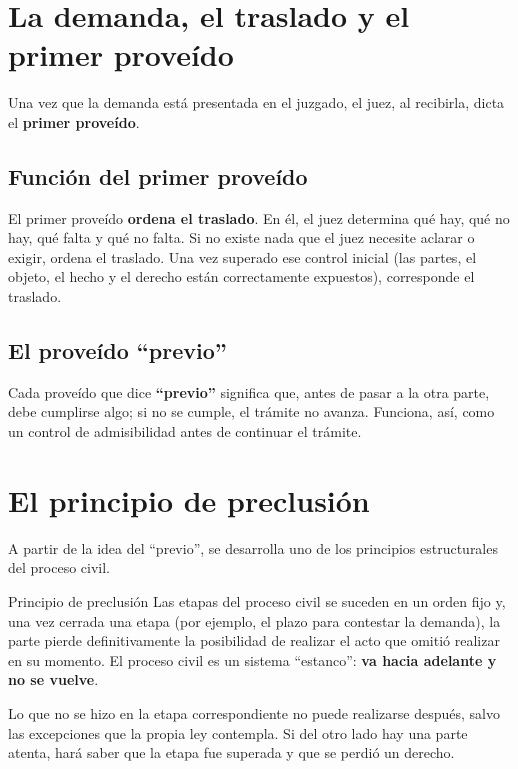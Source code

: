 \documentclass[12pt,oneside]{book}
\begin{document}
\section{La demanda, el traslado y el primer prove\'ido}

Una vez que la demanda est\'a presentada en el juzgado, el juez, al recibirla, dicta el \textbf{primer prove\'ido}.

\subsection{Funci\'on del primer prove\'ido}

El primer prove\'ido \textbf{ordena el traslado}. En \'el, el juez determina qu\'e hay, qu\'e no hay, qu\'e falta y qu\'e no falta. Si no existe nada que el juez necesite aclarar o exigir, ordena el traslado. Una vez superado ese control inicial (las partes, el objeto, el hecho y el derecho est\'an correctamente expuestos), corresponde el traslado.

\subsection{El prove\'ido ``previo''}

Cada prove\'ido que dice \textbf{``previo''} significa que, antes de pasar a la otra parte, debe cumplirse algo; si no se cumple, el tr\'amite no avanza. Funciona, as\'i, como un control de admisibilidad antes de continuar el tr\'amite.

\section{El principio de preclusi\'on}

A partir de la idea del ``previo'', se desarrolla uno de los principios estructurales del proceso civil.

\begin{definition}{Principio de preclusi\'on}
Las etapas del proceso civil se suceden en un orden fijo y, una vez cerrada una etapa (por ejemplo, el plazo para contestar la demanda), la parte pierde definitivamente la posibilidad de realizar el acto que omiti\'o realizar en su momento. El proceso civil es un sistema ``estanco'': \textbf{va hacia adelante y no se vuelve}.
\end{definition}

Lo que no se hizo en la etapa correspondiente no puede realizarse despu\'es, salvo las excepciones que la propia ley contempla. Si del otro lado hay una parte atenta, har\'a saber que la etapa fue superada y que se perdi\'o un derecho.
\end{document}
